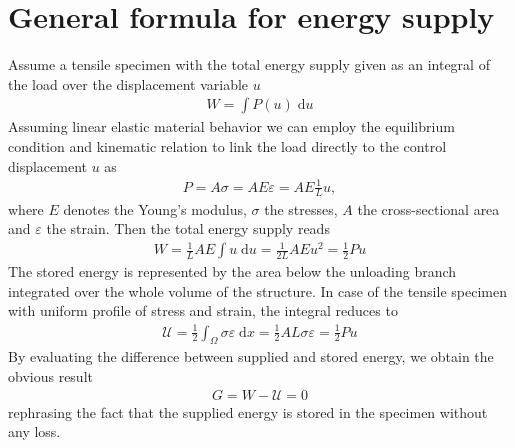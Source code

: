 \documentclass[main.tex]{subfiles}
\begin{document}

\section{General formula for energy supply}

Assume a tensile specimen with the total energy supply given as an integral of the load  over the displacement variable  $u$
\begin{align}
\label{eq:work_supply}
W = \int P(u) \; \mathrm{d}u
\end{align}
Assuming linear elastic material behavior we can employ the equilibrium condition and kinematic relation to link the load  directly to the control displacement $u$ as
\begin{align}
P = A \sigma = A E \varepsilon = A E \frac{1}{L} u,
\end{align}
where $E$ denotes the Young’s modulus, $\sigma$ the stresses, $A$ the cross-sectional area and $\varepsilon$ the strain. Then the total energy supply reads
\begin{align}
\label{eq:elastic_energy_supply}
W = 
\frac{1}{L} A E \int u \; \mathrm{d}u
=
\frac{1}{2L} A E u^2
=
\frac{1}{2} P u
\end{align}
The stored energy is 
represented by the area below the unloading branch integrated over the whole volume of the structure.
In case of the tensile specimen with uniform profile of stress and strain, the integral reduces to
\begin{align}
\mathcal{U}
=
\frac{1}{2}
\int_\Omega
\sigma
\varepsilon
\;
\mathrm{d}x
=
\frac{1}{2}
A L \sigma \varepsilon
=
\frac{1}{2}
P u
\end{align}
By evaluating the difference between supplied and stored energy, we obtain the obvious result
\begin{align}
G = W - \mathcal{U} = 0
\end{align}
rephrasing the fact that the supplied energy is stored in the specimen without any loss.
\end{document}
